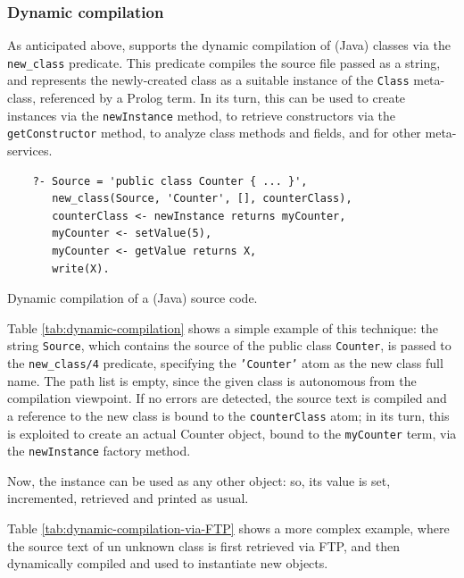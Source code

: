 \subsubsection{Dynamic compilation}

As anticipated above, \tuprolog{} supports the dynamic compilation of (Java) classes via the \texttt{new\_class} predicate. This predicate compiles the source file passed as a string, and represents the newly-created class as a suitable instance of the  \texttt{Class} meta-class, referenced by a Prolog term.
%
In its turn, this can be used to create instances via the \texttt{newInstance}
method, to retrieve constructors via the \texttt{getConstructor} method, to analyze class methods and fields, and for other meta-services.

\begin{table}
\begin{verbatim}
    ?- Source = 'public class Counter { ... }',
       new_class(Source, 'Counter', [], counterClass),
       counterClass <- newInstance returns myCounter,
       myCounter <- setValue(5),
       myCounter <- getValue returns X,
       write(X).
\end{verbatim}
\caption{Dynamic compilation of a (Java) source code.}
\label{tab:dynamic-compilation}
\end{table}

Table \ref{tab:dynamic-compilation} shows a simple example of this technique: the string \texttt{Source}, which contains the source of the public class \texttt{Counter}, is passed to the \texttt{new\_class/4} predicate, specifying the \texttt{'Counter'} atom as the new class full name. The path list is empty, since the given class is autonomous from the compilation viewpoint.
%
If no errors are detected, the source text is compiled and a reference to the new class is bound to the \texttt{counterClass} atom; in its turn, this is exploited to create an actual Counter object, bound to the \texttt{myCounter} term, via the \texttt{newInstance} factory method.

Now, the instance can be used as any other object: so, its value is set, incremented, retrieved and printed as usual.

Table \ref{tab:dynamic-compilation-via-FTP} shows a more complex example, where the source text of un unknown class is first retrieved via FTP, and then dynamically compiled and used to instantiate new objects.

